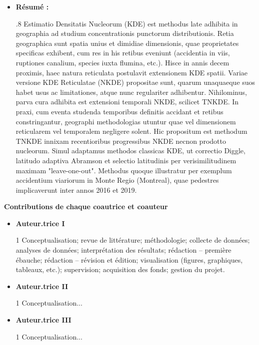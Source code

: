 \begin{itemize}
  
  \item \textbf{Résumé :} \begin{spacing}{.8} 
  \small Estimatio Densitatis Nucleorum (KDE) est methodus late adhibita in geographia ad studium concentrationis punctorum distributionis. Retia geographica sunt spatia unius et dimidiae dimensionis, quae proprietates specificas exhibent, cum res in his retibus eveniunt (accidentia in viis, ruptiones canalium, species iuxta flumina, etc.). Hisce in annis decem proximis, haec natura reticulata postulavit extensionem KDE spatii. Variae versione KDE Reticulatae (NKDE) propositae sunt, quarum unaquaeque suos habet usus ac limitationes, atque nunc regulariter adhibentur. Nihilominus, parva cura adhibita est extensioni temporali NKDE, scilicet TNKDE. In praxi, cum eventa studenda temporibus definitis accidant et retibus constringantur, geographi methodologias utuntur quae vel dimensionem reticularem vel temporalem negligere solent. Hic propositum est methodum TNKDE innixam recentioribus progressibus NKDE necnon prodotto nucleorum. Simul adaptamus methodos classicas KDE, ut correctio Diggle, latitudo adaptiva Abramson et selectio latitudinis per verisimilitudinem maximam "leave-one-out". Methodus quoque illustratur per exemplum accidentium viariorum in Monte Regio (Montreal), quae pedestres implicaverunt inter annos 2016 et 2019.
  \end{spacing}
\end{itemize}

{\large \textbf{Contributions de chaque coautrice et coauteur}}
\begin{itemize}
  \item \textbf{Auteur.trice I} 
  \begin{spacing}{1}  \small 
  Conceptualisation; revue de littérature; méthodologie; collecte de données; analyses de données; interprétation des résultats; rédaction – première ébauche; rédaction – révision et édition; visualisation (figures, graphiques, tableaux, etc.); supervision; acquisition des fonds; gestion du projet. 
  \end{spacing}

  \item \textbf{Auteur.trice II} 
      \begin{spacing}{1}  \small 
      Conceptualisation... 
      \end{spacing}
  
  \item \textbf{Auteur.trice III} 
    \begin{spacing}{1}  \small 
    Conceptualisation... 
    \end{spacing}
\end{itemize}

